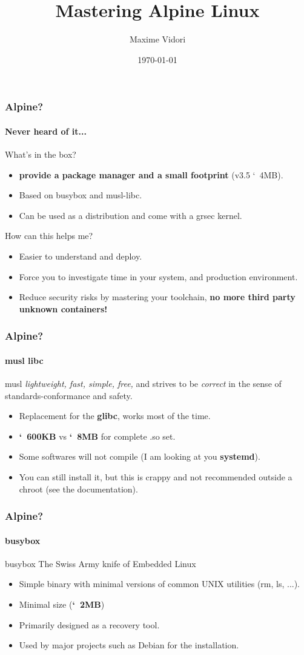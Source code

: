 \documentclass{beamer}
\title{Mastering Alpine Linux}
\date{\today}
\author{Maxime Vidori}
\begin{document}
\begin{frame}
  \titlepage
\end{frame}


\begin{frame}
  \frametitle{Alpine?}
  \framesubtitle{Never heard of it...}
  What's in the box?
  \begin{itemize}
    \item \textbf{provide a package manager and a small footprint} (v3.5 \char`~4MB).
    \item Based on busybox and musl-libc.
    \item Can be used as a distribution and come with a grsec kernel.
  \end{itemize}
  How can this helps me?
  \begin{itemize}
    \item Easier to understand and deploy.
    \item Force you to investigate time in your system, and production
      environment.
    \item Reduce security risks by mastering your toolchain,
      \textbf{no more third party unknown containers!}
  \end{itemize}
\end{frame}

\begin{frame}
  \frametitle{Alpine?}
  \framesubtitle{musl libc}
  \begin{block}{musl}
    \textit{lightweight, fast, simple, free,} and strives to be
    \textit{correct} in the sense of standards-conformance and safety.
    \end{block}
  \begin{itemize}
    \item Replacement for the \textbf{glibc}, works most of the time.
    \item \textbf{\char`~600KB} vs \textbf{\char`~8MB} for complete .so set.
    \item Some softwares will not compile (I am looking at you \textbf{systemd}).
  \item You can still install it, but this is crappy and not
      recommended outside a chroot (see the documentation).
  \end{itemize}
\end{frame}

\begin{frame}
  \frametitle{Alpine?}
  \framesubtitle{busybox}
  \begin{block}{busybox}
    The Swiss Army knife of Embedded Linux
  \end{block}
  \begin{itemize}
    \item Simple binary with minimal versions of common UNIX utilities
      (rm, ls, ...).
    \item Minimal size (\textbf{\char`~2MB})
    \item Primarily designed as a recovery tool.
    \item Used by major projects such as Debian for the installation.
  \end{itemize}
\end{frame}
\end{document}
